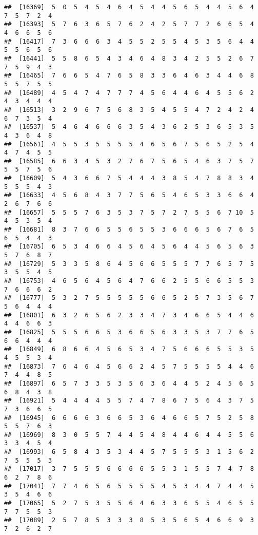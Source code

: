 \documentclass[
]{book}
\begin{document}
\begin{verbatim}
##  [16369]  5  0  5  4  5  4  6  4  5  4  4  5  6  5  4  4  5  6  4  7  5  7  2  4
##  [16393]  5  7  6  3  6  5  7  6  2  4  2  5  7  7  2  6  6  5  4  4  6  6  5  6
##  [16417]  7  3  6  6  6  3  4  5  5  2  5  5  4  5  3  5  6  4  4  5  5  6  5  6
##  [16441]  5  5  8  6  5  4  3  4  6  4  8  3  4  2  5  5  2  6  7  7  5  9  4  3
##  [16465]  7  6  6  5  4  7  6  5  8  3  3  6  4  6  3  4  4  6  8  5  5  7  5  5
##  [16489]  4  5  4  7  4  7  7  7  4  5  6  4  4  6  4  5  5  6  2  4  3  4  4  4
##  [16513]  3  2  9  6  7  5  6  8  3  5  4  5  5  4  7  2  4  2  4  6  7  3  5  4
##  [16537]  5  4  6  4  6  6  6  3  5  4  3  6  2  5  3  6  5  3  5  4  3  6  4  8
##  [16561]  4  5  5  3  5  5  5  5  4  6  5  6  7  5  6  5  2  5  4  4  7  4  5  5
##  [16585]  6  6  3  4  5  3  2  7  6  7  5  6  5  4  6  3  7  5  7  5  5  7  5  6
##  [16609]  5  4  3  6  6  7  5  4  4  4  3  8  5  4  7  8  8  3  4  5  5  5  4  3
##  [16633]  4  5  6  8  4  3  7  7  5  6  5  4  6  5  3  3  6  6  4  2  6  7  6  6
##  [16657]  5  5  5  7  6  3  5  3  7  5  7  2  7  5  5  6  7 10  5  4  5  3  5  4
##  [16681]  8  3  7  6  6  5  5  6  5  5  3  6  6  6  5  6  7  6  5  6  5  4  4  3
##  [16705]  6  5  3  4  6  6  4  5  6  4  5  6  4  4  5  6  5  6  3  5  7  6  8  7
##  [16729]  5  3  3  5  8  6  4  5  6  6  5  5  5  7  7  6  5  7  5  3  5  5  4  5
##  [16753]  4  6  5  6  4  5  6  4  7  6  6  2  5  5  6  6  5  5  3  7  6  6  6  2
##  [16777]  5  3  2  7  5  5  5  5  5  6  6  5  2  5  7  3  5  6  7  5  6  4  4  4
##  [16801]  6  3  2  6  5  6  2  3  3  4  7  3  4  6  6  5  4  4  6  4  4  6  6  3
##  [16825]  5  5  5  6  6  5  3  6  6  5  6  3  3  5  3  7  7  6  5  6  6  4  4  4
##  [16849]  6  8  6  6  4  5  6  5  3  4  7  5  6  6  6  5  5  3  5  4  5  5  3  4
##  [16873]  7  6  4  6  4  5  6  6  2  4  5  7  5  5  5  5  4  4  6  7  4  4  8  5
##  [16897]  6  5  7  3  3  5  3  5  6  3  6  4  4  5  2  4  5  6  5  6  8  4  3  8
##  [16921]  5  4  4  4  4  5  5  7  4  7  8  6  7  5  6  4  3  7  5  7  3  6  6  5
##  [16945]  6  6  6  6  3  6  6  5  3  6  4  6  6  5  7  5  2  5  8  5  5  7  6  3
##  [16969]  8  3  0  5  5  7  4  4  5  4  8  4  4  6  4  4  5  5  6  3  3  4  5  4
##  [16993]  6  5  8  4  3  5  3  4  4  5  7  5  5  5  3  1  5  6  2  7  5  5  5  3
##  [17017]  3  7  5  5  5  6  6  6  6  5  5  3  1  5  5  7  4  7  8  6  2  7  8  6
##  [17041]  7  7  4  6  5  6  5  5  5  5  4  5  3  4  4  7  4  4  5  3  5  4  6  6
##  [17065]  5  2  7  5  3  5  5  6  4  6  3  3  6  5  5  4  6  5  5  7  7  5  5  3
##  [17089]  2  5  7  8  5  3  3  3  8  5  3  5  6  5  4  6  6  9  3  7  2  6  2  7

\end{verbatim}
\end{document}
